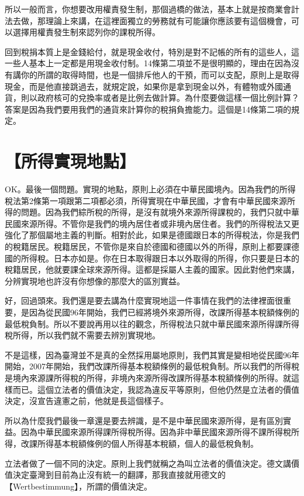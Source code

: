 \documentclass[]{ctexbook}
\begin{document}
所以一般而言，你想要改用權責發生制，那個過橋的做法，基本上就是按商業會計法去做，那理論上來講，在這裡面獨立的勞務就有可能讓你應該要有這個機會，可以選擇用權責發生制來認列你的課稅所得。

回到稅捐本質上是金錢給付，就是現金收付，特別是對不記帳的所有的這些人，這一些人基本上一定都是用現金收付制。14條第二項並不是很明顯的，理由在因為沒有講你的所謂的取得時間，也是一個排斥他人的干預，而可以支配，原則上是取得現金，而是他直接跳過去，就規定說，如果你是拿到現金以外，有體物或外國通貨，則以政府核可的兌換率或者是比例去做計算。為什麼要做這樣一個比例計算？答案是因為我們要用我們的通貨來計算你的稅捐負擔能力。這個是14條第二項的規定。

\hypertarget{ux6240ux5f97ux5be6ux73feux5730ux9ede}{%
\section{【所得實現地點】}\label{ux6240ux5f97ux5be6ux73feux5730ux9ede}}

OK。最後一個問題。實現的地點，原則上必須在中華民國境內。因為我們的所得稅法第2條第一項跟第二項都必須，所得實現在中華民國，才會有中華民國來源所得的問題。因為我們綜所稅的所得，是沒有就境外來源所得課稅的，我們只就中華民國來源所得。不管你是我們的境內居住者或非境內居住者。我們的所得稅法又更強化了那個屬地主義的判斷。相對於此，如果是德國跟日本的所得稅法，你是我們的稅籍居民。稅籍居民，不管你是來自於德國和德國以外的所得，原則上都要課德國的所得稅。日本亦如是。你在日本取得跟日本以外取得的所得，你只要是日本的稅籍居民，他就要課全球來源所得。這都是採屬人主義的國家。因此對他們來講，分辨實現地也許沒有你想像的那麼大的區別實益。

好，回過頭來。我們還是要去講為什麼實現地這一件事情在我們的法律裡面很重要，是因為從民國96年開始，我們已經將境外來源所得，改課所得基本稅額條例的最低稅負制。所以不要說再用以往的觀念，所得稅法只就中華民國來源所得課所得稅所得，所以我們就不需要去辨別實現地。

不是這樣，因為臺灣並不是真的全然採用屬地原則，我們其實是變相地從民國96年開始，2007年開始，我們改課所得基本稅額條例的最低稅負制。所以我們的所得稅是境內來源課所得稅的所得，非境內來源所得改課所得基本稅額條例的所得。就這樣而已。這個立法者的價值決定，我認為違反平等原則，但他仍然是立法者的價值決定，沒宣告違憲之前，他就是長這個樣子。

所以為什麼我們最後一章還是要去辨識，是不是中華民國來源所得，是有區別實益。因為中華民國來源所得課所得稅所得。因為非中華民國來源所得不課所得稅所得，改課所得基本稅額條例的個人所得基本稅額，個人的最低稅負制。

立法者做了一個不同的決定。原則上我們就稱之為叫立法者的價值決定。德文講價值決定臺灣到目前為止沒有統一的翻譯，那我直接就用德文的【Wertbestimmung】，所謂的價值決定。
\end{document}
